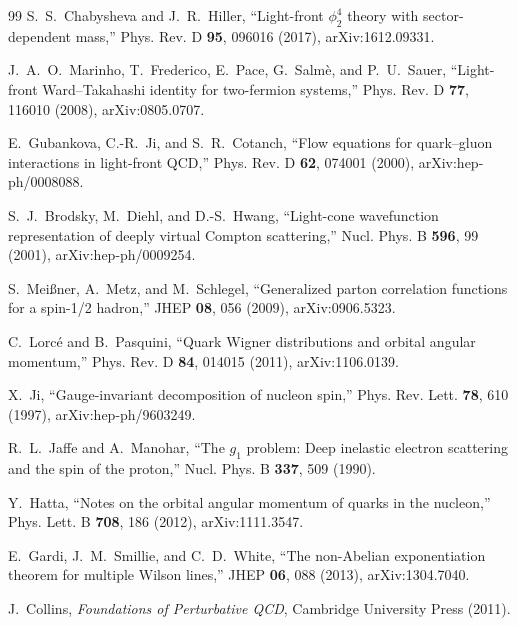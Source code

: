 \documentclass[11pt]{article}
\begin{document}
\begin{thebibliography}{99}
S.~S.~Chabysheva and J.~R.~Hiller,
``Light-front \(\phi_2^4\) theory with sector-dependent mass,''
Phys. Rev. D \textbf{95}, 096016 (2017),
arXiv:1612.09331.

J.~A.~O.~Marinho, T.~Frederico, E.~Pace, G.~Salm\`e, and P.~U.~Sauer,
``Light-front Ward--Takahashi identity for two-fermion systems,''
Phys. Rev. D \textbf{77}, 116010 (2008),
arXiv:0805.0707.

E.~Gubankova, C.-R.~Ji, and S.~R.~Cotanch,
``Flow equations for quark--gluon interactions in light-front QCD,''
Phys. Rev. D \textbf{62}, 074001 (2000),
arXiv:hep-ph/0008088.

S.~J.~Brodsky, M.~Diehl, and D.-S.~Hwang,
``Light-cone wavefunction representation of deeply virtual Compton
scattering,''
Nucl. Phys. B \textbf{596}, 99 (2001),
arXiv:hep-ph/0009254.

S.~Mei{\ss}ner, A.~Metz, and M.~Schlegel,
``Generalized parton correlation functions for a spin-1/2 hadron,''
JHEP \textbf{08}, 056 (2009),
arXiv:0906.5323.

C.~Lorc\'e and B.~Pasquini,
``Quark Wigner distributions and orbital angular momentum,''
Phys. Rev. D \textbf{84}, 014015 (2011),
arXiv:1106.0139.

X.~Ji,
``Gauge-invariant decomposition of nucleon spin,''
Phys. Rev. Lett. \textbf{78}, 610 (1997),
arXiv:hep-ph/9603249.

R.~L.~Jaffe and A.~Manohar,
``The \(g_1\) problem: Deep inelastic electron scattering and the spin of the
proton,''
Nucl. Phys. B \textbf{337}, 509 (1990).

Y.~Hatta,
``Notes on the orbital angular momentum of quarks in the nucleon,''
Phys. Lett. B \textbf{708}, 186 (2012),
arXiv:1111.3547.

E.~Gardi, J.~M.~Smillie, and C.~D.~White,
``The non-Abelian exponentiation theorem for multiple Wilson lines,''
JHEP \textbf{06}, 088 (2013),
arXiv:1304.7040.

J.~Collins,
\emph{Foundations of Perturbative QCD},
Cambridge University Press (2011).

\end{thebibliography}
\end{document}
